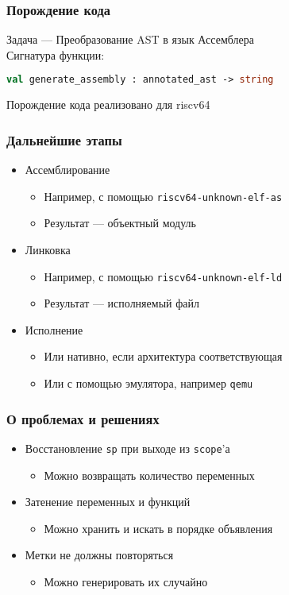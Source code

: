 \documentclass{beamer}
\begin{document}
	\begin{frame}[fragile]
		\frametitle{Порождение кода}
		Задача — Преобразование AST в язык Ассемблера
		\\
		Сигнатура функции:
		\begin{lstlisting}[language=ML] 
		val generate_assembly : annotated_ast -> string
		\end{lstlisting}
		
		Порождение кода реализовано для riscv64
	\end{frame}

	\begin{frame}
		\frametitle{Дальнейшие этапы}
		\begin{itemize}
			\item Ассемблирование
			\begin{itemize}
				\item Например, с помощью \lstinline|riscv64-unknown-elf-as|
				\item Результат — объектный модуль
			\end{itemize}
			\item Линковка
				\begin{itemize}
					\item Например, с помощью \lstinline|riscv64-unknown-elf-ld|
					\item Результат — исполняемый файл
				\end{itemize}
			\item Исполнение
			\begin{itemize}
				\item Или нативно, если архитектура соответствующая
				\item Или с помощью эмулятора, например \lstinline|qemu|
			\end{itemize}
		\end{itemize}
	\end{frame}

	\begin{frame}
		\frametitle{О проблемах и решениях}
		\begin{itemize}
			\item Восстановление \lstinline|sp| при выходе из \lstinline|scope|'а
			\begin{itemize}
				\item Можно возвращать количество переменных
			\end{itemize}
			\item Затенение переменных и функций
			\begin{itemize}		
				\item Можно хранить и искать в порядке объявления
			\end{itemize}
			\item Метки не должны повторяться
			\begin{itemize}
				\item Можно генерировать их случайно
			\end{itemize}
		\end{itemize}
	\end{frame}
\end{document}
